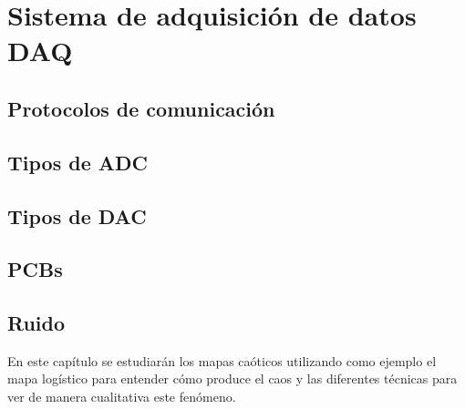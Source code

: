 \chapter{Sistema de adquisición de datos DAQ}
	
	\section{Protocolos de comunicación}

	\section{Tipos de ADC}
	
	\section{Tipos de DAC}
	
	\section{PCBs}
	
	
	\section{Ruido}
	
	
    
    En este capítulo se estudiarán los mapas caóticos utilizando como ejemplo el mapa logístico para entender cómo produce el caos y las diferentes técnicas para ver de manera cualitativa este fenómeno.

